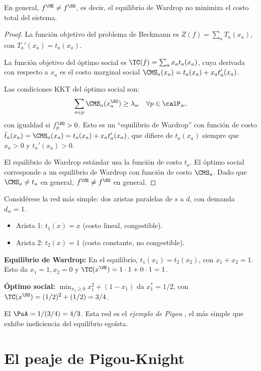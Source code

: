 \begin{proposition}\label{prop:ue_ne_so}
En general, $f^{\UE} \neq f^{\SO}$, es decir, el equilibrio de Wardrop no minimiza el costo total del sistema.
\end{proposition}

\begin{proof}
La función objetivo del problema de Beckmann es $Z(f) = \sum_a T_a(x_a)$, con $T_a'(x_a) = t_a(x_a)$.

La función objetivo del óptimo social es $\TC(f) = \sum_a x_a t_a(x_a)$, cuya derivada con respecto a $x_a$ es el costo marginal social $\CMS_a(x_a) = t_a(x_a) + x_a t_a'(x_a)$.

Las condiciones KKT del óptimo social son:
\[
\sum_{a \in p} \CMS_a(x_a^{\SO}) \geq \lambda_w \quad \forall p \in \calP_w,
\]
con igualdad si $f_p^{\SO} > 0$. Esto es un ``equilibrio de Wardrop'' con función de costo $\tilde{t}_a(x_a) = \CMS_a(x_a) = t_a(x_a) + x_a t_a'(x_a)$, que difiere de $t_a(x_a)$ siempre que $x_a > 0$ y $t_a'(x_a) > 0$.

El equilibrio de Wardrop estándar usa la función de costo $t_a$. El óptimo social corresponde a un equilibrio de Wardrop con función de costo $\CMS_a$. Dado que $\CMS_a \neq t_a$ en general, $f^{\UE} \neq f^{\SO}$ en general.
\end{proof}

\begin{example}\label{ex:pigou}
Considérese la red más simple: dos aristas paralelas de $s$ a $d$, con demanda $d_w = 1$.
\begin{itemize}
    \item Arista 1: $t_1(x) = x$ (costo lineal, congestible).
    \item Arista 2: $t_2(x) = 1$ (costo constante, no congestible).
\end{itemize}
\textbf{Equilibrio de Wardrop:} En el equilibrio, $t_1(x_1) = t_2(x_2)$, con $x_1 + x_2 = 1$. Esto da $x_1 = 1, x_2 = 0$ y $\TC(x^{\UE}) = 1 \cdot 1 + 0 \cdot 1 = 1$.

\textbf{Óptimo social:} $\min_{x_1 \geq 0} x_1^2 + (1-x_1)$ da $x_1^* = 1/2$, con $\TC(x^{\SO}) = (1/2)^2 + (1/2) = 3/4$.

El $\PoA = 1 / (3/4) = 4/3$. Esta red es el \emph{ejemplo de Pigou} \cite{Pigou1920}, el más simple que exhibe ineficiencia del equilibrio egoísta.
\end{example}

\section{El peaje de Pigou-Knight}


